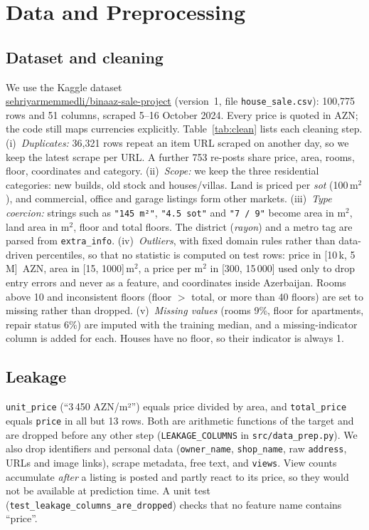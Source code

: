 \documentclass[10pt,twocolumn,a4paper]{article}
\begin{document}
\section{Data and Preprocessing}
\subsection{Dataset and cleaning}
We use the Kaggle dataset\\ \url{sehriyarmemmedli/binaaz-sale-project}
(version~1, file \texttt{house\_sale.csv}): 100{,}775 rows and 51
columns, scraped 5--16 October 2024. Every price is quoted in AZN; the code
still maps currencies explicitly. Table~\ref{tab:clean} lists each
cleaning step.
(i)~\emph{Duplicates:} 36{,}321 rows repeat an item URL scraped on
another day, so we keep the latest scrape per URL. A further 753 re-posts
share price, area, rooms, floor, coordinates and category.
(ii)~\emph{Scope:} we keep the three residential categories: new
builds, old stock and houses/villas. Land is priced per \textit{sot}
(100\,m$^2$), and commercial, office and garage listings form other
markets.
(iii)~\emph{Type coercion:} strings such as \texttt{"145 m²"},
\texttt{"4.5 sot"} and \texttt{"7 / 9"} become area in m$^2$, land area in m$^2$,
floor and total floors. The district (\textit{rayon}) and a metro tag are
parsed from \texttt{extra\_info}.
(iv)~\emph{Outliers}, with fixed domain rules rather than data-driven
percentiles, so that no statistic is computed on test rows: price in
[10\,k, 5\,M]~AZN, area in [15, 1000]\,m$^2$, a price per m$^2$ in
[300, 15\,000] used only to drop entry errors and never as a feature, and
coordinates inside Azerbaijan. Rooms above 10 and inconsistent floors
(floor $>$ total, or more than 40 floors) are set to missing rather than
dropped.
(v)~\emph{Missing values} (rooms 9\%, floor for apartments, repair
status 6\%) are imputed with the training median, and a missing-indicator
column is added for each. Houses have no floor, so their indicator is
always 1.

\begin{table}[t]
  \centering\small
  \caption{Cleaning log (rows left after each step).}
  \label{tab:clean}
  
\end{table}

\subsection{Leakage}
\texttt{unit\_price} (``3\,450 AZN/m²'') equals price divided by area, and
\texttt{total\_price} equals \texttt{price} in all but 13 rows. Both are
arithmetic functions of the target and are dropped before any other step
(\texttt{LEAKAGE\_COLUMNS} in \texttt{src/data\_prep.py}). We also drop
identifiers and personal data (\texttt{owner\_name}, \texttt{shop\_name},
raw \texttt{address}, URLs and image links), scrape metadata, free text,
and \texttt{views}. View counts accumulate \emph{after} a listing is posted
and partly react to its price, so they would not be available at
prediction time. A unit test (\texttt{test\_leakage\_columns\_are\_dropped})
checks that no feature name contains ``price''.
\end{document}
